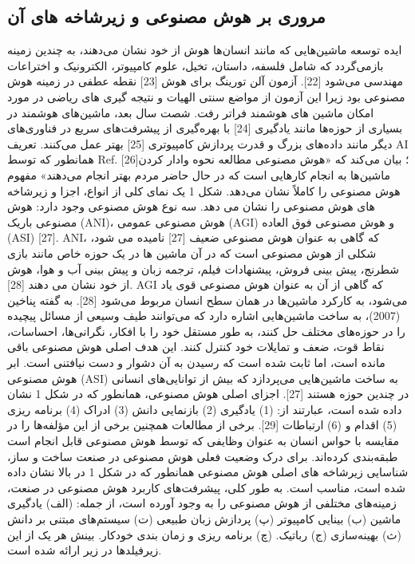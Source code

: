 \documentclass[towcolumn, 11pt]{Article}
\begin{document}
\begin{چکیده}
\section{مروری بر هوش مصنوعی و زیرشاخه های آن}
ایده توسعه ماشین‌هایی که مانند انسان‌ها هوش از خود نشان می‌دهند، به چندین زمینه بازمی‌گردد که شامل فلسفه، داستان، تخیل، علوم کامپیوتر، الکترونیک و اختراعات مهندسی می‌شود [22]. آزمون آلن تورینگ برای هوش [23] نقطه عطفی در زمینه هوش مصنوعی بود زیرا این آزمون از مواضع سنتی الهیات و نتیجه گیری های ریاضی در مورد امکان ماشین های هوشمند فراتر رفت. شصت سال بعد، ماشین‌های هوشمند در بسیاری از حوزه‌ها مانند یادگیری [24] با بهره‌گیری از پیشرفت‌های سریع در فناوری‌های دیگر مانند داده‌های بزرگ و قدرت پردازش کامپیوتری [25] بهتر عمل می‌کنند. تعریف AI همانطور که توسط Ref. [26]؛ بیان می‌کند که «هوش مصنوعی مطالعه نحوه وادار کردن ماشین‌ها به انجام کارهایی است که در حال حاضر مردم بهتر انجام می‌دهند» مفهوم هوش مصنوعی را کاملاً نشان می‌دهد. شکل 1 یک نمای کلی از انواع، اجزا و زیرشاخه های هوش مصنوعی را نشان می دهد.
سه نوع هوش مصنوعی وجود دارد: هوش مصنوعی باریک (ANI)، هوش مصنوعی عمومی (AGI) و هوش مصنوعی فوق العاده (ASI) [27]. ANI، که گاهی به عنوان هوش مصنوعی ضعیف [27] نامیده می شود، شکلی از هوش مصنوعی است که در آن ماشین ها در یک حوزه خاص مانند بازی شطرنج، پیش بینی فروش، پیشنهادات فیلم، ترجمه زبان و پیش بینی آب و هوا، هوش از خود نشان می دهند [28]. AGI که گاهی از آن به عنوان هوش مصنوعی قوی یاد می‌شود، به کارکرد ماشین‌ها در همان سطح انسان مربوط می‌شود [28]. به گفته پناخین (2007)، به ساخت ماشین‌هایی اشاره دارد که می‌توانند طیف وسیعی از مسائل پیچیده را در حوزه‌های مختلف حل کنند، به طور مستقل خود را با افکار، نگرانی‌ها، احساسات، نقاط قوت، ضعف و تمایلات خود کنترل کنند. این هدف اصلی هوش مصنوعی باقی مانده است، اما ثابت شده است که رسیدن به آن دشوار و دست نیافتنی است. ابر هوش مصنوعی (ASI) به ساخت ماشین‌هایی می‌پردازد که بیش از توانایی‌های انسانی در چندین حوزه هستند [27]. اجزای اصلی هوش مصنوعی، همانطور که در شکل 1 نشان داده شده است، عبارتند از: (1) یادگیری (2) بازنمایی دانش (3) ادراک (4) برنامه ریزی (5) اقدام و (6) ارتباطات [29]. برخی از مطالعات همچنین برخی از این مؤلفه‌ها را در مقایسه با حواس انسان به عنوان وظایفی که توسط هوش مصنوعی قابل انجام است طبقه‌بندی کرده‌اند. برای درک وضعیت فعلی هوش مصنوعی در صنعت ساخت و ساز، شناسایی زیرشاخه های اصلی هوش مصنوعی همانطور که در شکل 1 در بالا نشان داده شده است، مناسب است. به طور کلی، پیشرفت‌های کاربرد هوش مصنوعی در صنعت، زمینه‌های مختلفی از هوش مصنوعی را به وجود آورده است، از جمله: (الف) یادگیری ماشین (ب) بینایی کامپیوتر (پ) پردازش زبان طبیعی (ت) سیستم‌های مبتنی بر دانش (ث) بهینه‌سازی (ج) رباتیک. (چ) برنامه ریزی و زمان بندی خودکار. بینش هر یک از این زیرفیلدها در زیر ارائه شده است. 



\end{چکیده}
\end{document}
